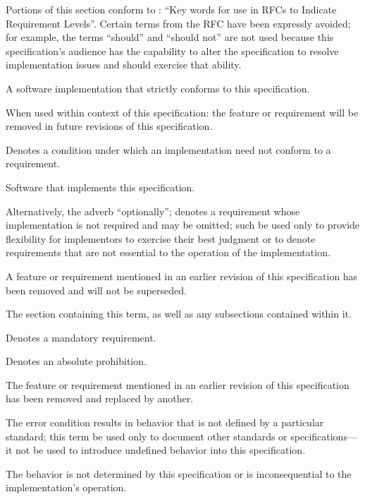 %

Portions of this section conform to : ``Key words for use in RFCs to
Indicate Requirement Levels''. Certain terms from the RFC have been expressly
avoided; for example, the terms ``should'' and ``should not'' are not used
because this specification's audience has the capability to alter the
specification to resolve implementation issues and should exercise that ability.

\begin{description}
  A software implementation that strictly conforms to this specification.

  When used within context of this specification: the feature or requirement
  will be removed in future revisions of this specification.

  Denotes a condition under which an implementation need not conform to a
  requirement.

  Software that implements this specification.

  Alternatively, the adverb ``optionally''; denotes a requirement whose
  implementation is not required and may be omitted; such \shall be used only to
  provide flexibility for implementors to exercise their best judgment or to
  denote requirements that are not essential to the operation of the
  implementation.

  A feature or requirement mentioned in an earlier revision of this
  specification has been removed and will not be superseded.

  The section containing this term, as well as any subsections contained within
  it.

  Denotes a mandatory requirement.

  Denotes an absolute prohibition.

  The feature or requirement mentioned in an earlier revision of this
  specification has been removed and replaced by another.

  The error condition results in behavior that is not defined by a particular
  standard; this term \shall be used only to document other standards or
  specifications---it \shall not be used to introduce undefined behavior into
  this specification.

  The behavior is not determined by this specification or is inconsequential to
  the implementation's operation.
\end{description}
